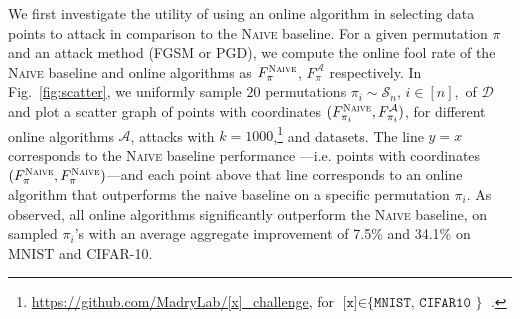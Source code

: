 We first investigate the utility of using an online algorithm in selecting data points to attack in comparison to the \textsc{Naive} baseline. For a given permutation $\pi$ and an attack method (FGSM or PGD), we compute the online fool rate of the \textsc{Naive} baseline and online algorithms as $F^{\textsc{Naive}}_\pi$, $F^{\mathcal{A}}_\pi$ respectively. In Fig.~\ref{fig:scatter}, we uniformly sample $20$ permutations $\pi_i \sim \mathcal{S}_n, \, i \in [n],$ of $\mathcal{D}$ and plot a scatter graph of points with coordinates $(F^{\textsc{Naive}}_{\pi_i}, F^{\mathcal{A}}_{\pi_i})$, for different online algorithms $\mathcal{A}$, attacks with $k=1000$,\footnote{\small \url{https://github.com/MadryLab/[x]_challenge}, for $\texttt{[x]} \in \texttt{\{MNIST, CIFAR10 \}}$ .} and datasets. The line $y=x$ corresponds to the \textsc{Naive} baseline performance ---i.e. points with coordinates $(F^{\textsc{Naive}}_\pi, F^{\textsc{Naive}}_\pi)$---and each point above that line corresponds to an online algorithm that outperforms the naive baseline on a specific permutation $\pi_i$. As observed, all online algorithms significantly outperform the \textsc{Naive} baseline, on sampled $\pi_i$'s with an average aggregate improvement of 7.5\% and 34.1\% on MNIST and CIFAR-10.


